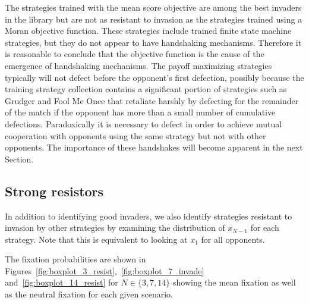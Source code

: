 \documentclass{article}
\begin{document}
The strategies trained with the mean score
objective are among the best invaders in the library but are not as resistant
to invasion as the strategies trained using a Moran objective function. These strategies include trained finite state machine
strategies, but they do not appear to have handshaking mechanisms. Therefore it
is reasonable to conclude that the objective function is the cause of the
emergence of handshaking mechanisms.
The payoff maximizing strategies
typically will not defect before the opponent's first defection, possibly
because the training strategy collection contains a significant portion of
strategies such as Grudger and Fool Me Once that retaliate harshly by defecting
for the remainder of the match if the opponent has more than a small number of
cumulative defections. Paradoxically it is necessary to defect in order to
achieve mutual cooperation with opponents using the same strategy but not with
other opponents. The importance of these handshakes will become apparent in the
next Section.

\subsection{Strong resistors}\label{sec:strong_resistors}

In addition to identifying good invaders, we also identify strategies
resistant to invasion by other strategies by examining the distribution
of $x_{N-1}$ for each strategy. Note that this is equivalent to
looking at $x_1$ for all opponents.

The fixation
probabilities are shown in
Figures~\ref{fig:boxplot_3_resist},~\ref{fig:boxplot_7_invade}
and~\ref{fig:boxplot_14_resist} for \(N\in\{3, 7, 14\}\) showing the mean
fixation as well as the neutral fixation for each given scenario.
\end{document}
